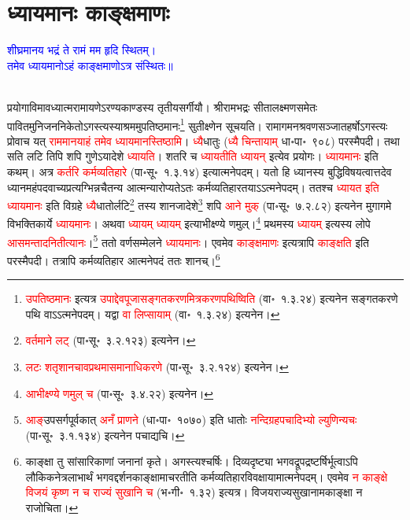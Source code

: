 \section[ध्यायमानः काङ्क्षमाणः]{ध्यायमानः काङ्क्षमाणः}
\centering\textcolor{blue}{शीघ्रमानय भद्रं ते रामं मम हृदि स्थितम्।\nopagebreak\\
तमेव ध्यायमानोऽहं काङ्क्षमाणोऽत्र संस्थितः॥}\nopagebreak\\
\\
\begin{sloppypar}\justifying\noindent\hspace{10mm} प्रयोगाविमावध्यात्म\-रामायणेऽरण्य\-काण्डस्य तृतीय\-सर्गीयौ। श्रीरामभद्रः सीता\-लक्ष्मण\-समेतः पावित\-मुनि\-जन\-निकेतोऽगस्त्यस्याश्रममुप\-तिष्ठमानः\footnote{\textcolor{red}{उपतिष्ठमानः} इत्यत्र \textcolor{red}{उपाद्देवपूजा\-सङ्गतकरण\-मित्रकरण\-पथिष्विति} (वा॰~१.३.२४) इत्यनेन सङ्गतकरणे पथि वाऽऽत्मनेपदम्। यद्वा \textcolor{red}{वा लिप्सायाम्} (वा॰~१.३.२४) इत्यनेन।} सुतीक्ष्णेन सूचयति। रामागमन\-श्रवण\-सञ्जात\-हर्षोऽगस्त्यः प्रोवाच यत् \textcolor{red}{राममानयाहं तमेव ध्यायमानस्तिष्ठामि}। \textcolor{red}{ध्यै}\-धातुः (\textcolor{red}{ध्यै चिन्तायाम्} धा॰पा॰~९०८) परस्मैपदी। तथा सति लटि तिपि शपि गुणेऽयादेशे \textcolor{red}{ध्यायति}। शतरि च \textcolor{red}{ध्यायतीति ध्यायन्} इत्येव प्रयोगः। \textcolor{red}{ध्यायमानः} इति कथम्। अत्र \textcolor{red}{कर्तरि कर्म\-व्यतिहारे} (पा॰सू॰~१.३.१४) इत्यात्मनेपदम्। यतो हि ध्यानस्य बुद्धि\-विषयत्वात्तदेव ध्यानमहं\-पद\-वाच्य\-प्रत्यग्भिन्न\-चैतन्य आत्मन्यारोप्यतेऽतः कर्म\-व्यतिहारतयाऽऽत्मनेपदम्। ततश्च \textcolor{red}{ध्यायत इति ध्यायमानः} इति विग्रहे \textcolor{red}{ध्यै}\-धातोर्लटि\footnote{\textcolor{red}{वर्तमाने लट्} (पा॰सू॰~३.२.१२३) इत्यनेन।} तस्य शानजादेशे\footnote{\textcolor{red}{लटः शतृशानचावप्रथमा\-समानाधिकरणे} (पा॰सू॰~३.२.१२४) इत्यनेन।} शपि \textcolor{red}{आने मुक्} (पा॰सू॰~७.२.८२) इत्यनेन मुगागमे विभक्ति\-कार्ये \textcolor{red}{ध्यायमानः}। अथवा \textcolor{red}{ध्यायम् ध्यायम्} इत्याभीक्ष्ण्ये णमुल्।\footnote{\textcolor{red}{आभीक्ष्ण्ये णमुल् च} (पा॰सू॰~३.४.२२) इत्यनेन।} प्रथमस्य \textcolor{red}{ध्यायम्} इत्यस्य लोपे \textcolor{red}{आसमन्तादनितीत्यानः}।\footnote{\textcolor{red}{आङ्‌}\-उपसर्ग\-पूर्वकात् \textcolor{red}{अनँ प्राणने} (धा॰पा॰~१०७०) इति धातोः \textcolor{red}{नन्दि\-ग्रह\-पचादिभ्यो ल्युणिन्यचः} (पा॰सू॰~३.१.१३४) इत्यनेन पचाद्यचि।} ततो वर्णसम्मेलने \textcolor{red}{ध्यायमानः}। एवमेव \textcolor{red}{काङ्क्षमाणः} इत्यत्रापि \textcolor{red}{काङ्क्षति} इति परस्मैपदी। तत्रापि कर्म\-व्यतिहार आत्मने\-पदं ततः शानच्।\footnote{काङ्क्षा तु सांसारिकाणां जनानां कृते। अगस्त्यश्चर्षिः। दिव्यदृष्ट्या भगवद्रूप\-द्रष्टर्षिर्भूत्वाऽपि लौकिक\-नेत्र\-लाभार्थं भगवद्दर्शन\-काङ्क्षामाचरतीति कर्म\-व्यतिहार\-विवक्षायामात्मने\-पदम्। एवमेव \textcolor{red}{न काङ्क्षे विजयं कृष्ण न च राज्यं सुखानि च} (भ॰गी॰~१.३२) इत्यत्र। विजय\-राज्य\-सुखानामकाङ्क्षा न राजोचिता।}\end{sloppypar}

